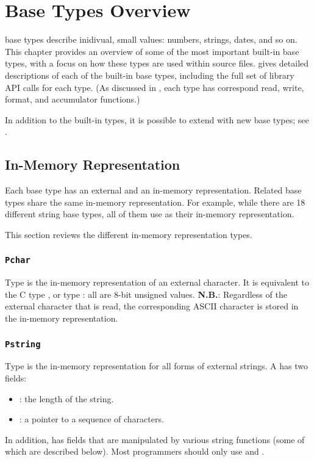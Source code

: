 
\chapter{Base Types Overview}
\label{chap:base-types}

\PADSL{} base types describe inidivual, small values: numbers, strings, dates, and so on.
This chapter provides an overview of some of the most important built-in \PADSL{} base types,
with a focus on how these types are used within \PADSL{} source files.
 gives detailed descriptions of each of the built-in base types,
including the full set of library API calls for each type.  (As discussed in
, each type has correspond read, write,
format, and accumulator functions.) 

In addition to the built-in types, it is possible to extend \PADSL{} with 
new base types; see .

\section{In-Memory Representation}
\label{sec:base-types-rep}

Each base type has an external and an in-memory representation. 
Related base types share the same in-memory representation.  For
example, while there are 18 different string base types, all of them
use  as their in-memory representation.

This section reviews the different in-memory representation types.

\subsection{{\tt Pchar}}

Type  is the in-memory representation of an external
character.  It is equivalent to the C type , or type
: all are 8-bit unsigned values.  {\bf N.B.}: Regardless of the
external character that is read, the corresponding ASCII character is stored in 
the in-memory representation.

\subsection{{\tt Pstring}}

Type  is the in-memory representation for all forms of
external strings.  A   has two fields:
\begin{itemize}
\item {} : the length of the string.
\item {} : a pointer to a sequence of  characters.
\end{itemize}
In addition,  has fields that are manipulated
by various string functions (some of which are described below).
Most programmers should only use  and .

